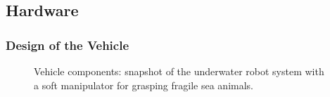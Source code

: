 \subsection{Hardware}

\subsubsection{Design of the Vehicle}

\begin{figure}[htb]
    \caption[Vehicle components]{Vehicle components: snapshot of the underwater
        robot system with a soft manipulator for grasping fragile sea
        animals.}\label{f:vehicle}
\end{figure}

